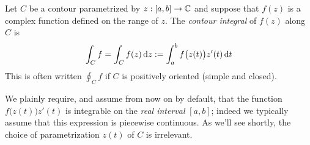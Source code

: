 \begin{defn}{}{}
	Let $C$ be a contour parametrized by $z:[a,b]\to\mathbb{C}$ and suppose that $f(z)$ is a complex function defined on the range of $z$. The \emph{contour integral} of $f(z)$ along $C$ is
	\[
		\int_Cf=\int_Cf(z)\,{\mathrm{d} z}:=\int_a^bf\bigl(z(t)\bigr) z'(t)\,{\mathrm{d} t}
	\]
	This is often written $\oint_Cf$ if $C$ is positively oriented (simple and closed).%
\end{defn}

We plainly require, and assume from now on by default, that the function $f\bigl(z(t)\bigr)z'(t)$ is integrable on the \emph{real interval} $[a,b]$; indeed we typically assume that this expression is piecewise continuous. As we'll see shortly, the choice of parametrization $z(t)$ of $C$ is irrelevant.
\goodbreak



